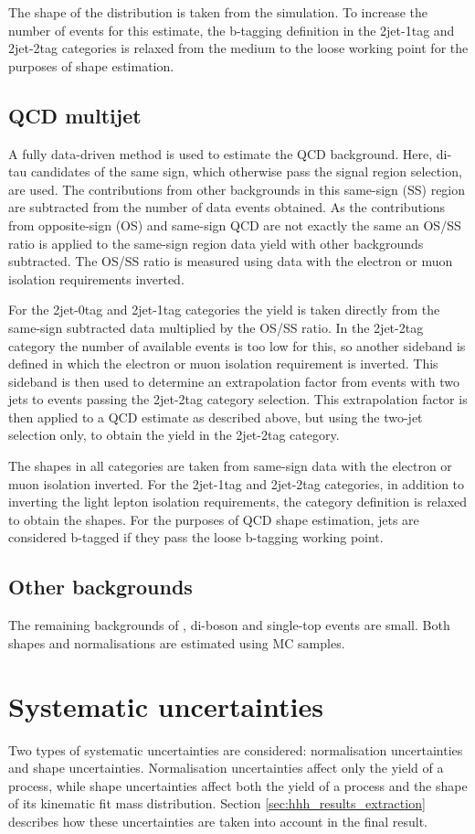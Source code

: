 The shape of the \Wjets distribution is taken from the simulation. To 
increase the number of events for this estimate, the b-tagging definition
in the 2jet-1tag and 2jet-2tag categories is relaxed from the medium to the loose 
working point for the purposes of shape estimation.
\subsection{QCD multijet}
\label{sec:hhh_backgrounds_qcd}
A fully data-driven method is used to estimate the QCD background. Here, di-tau candidates
of the same sign, which otherwise pass the signal region selection, are used. 
The contributions from other backgrounds
in this same-sign (SS) region are subtracted from the number of data events obtained.
As the contributions from opposite-sign (OS) and same-sign QCD are
not exactly the same an OS/SS ratio is applied to the same-sign region data yield with other backgrounds subtracted.
The OS/SS ratio is measured using data with 
the electron or muon isolation requirements inverted. 

For the 2jet-0tag and 2jet-1tag categories the yield is taken directly from
the same-sign subtracted data multiplied by the OS/SS ratio. In the 2jet-2tag
category the number of available events is too low for this, so another sideband is defined
in which the electron or muon isolation requirement is inverted. This 
sideband is then used to determine an extrapolation factor from events
with two jets to events passing the 2jet-2tag category selection. This extrapolation
factor is then applied to a QCD estimate as described above, but using the two-jet 
selection only, to obtain the yield in the 2jet-2tag category.

The shapes in all categories are taken from same-sign data with the electron or muon
isolation inverted. For the 2jet-1tag and 2jet-2tag categories, in addition to 
inverting the light lepton isolation requirements, the category definition
is relaxed to obtain the shapes. For the purposes of QCD shape
estimation, jets are considered b-tagged if they pass the loose b-tagging
working point.
\subsection{Other backgrounds}
\label{sec:hhh_backgrounds_other}
The remaining backgrounds of \Zellell, di-boson and single-top
events are small. Both shapes and normalisations are
estimated using \ac{MC} samples.
 
\section{Systematic uncertainties}
\label{sec:hhh_uncs}
Two types of systematic uncertainties are considered: normalisation
uncertainties and shape uncertainties. Normalisation uncertainties affect only
the yield of a process, while shape uncertainties affect both the yield of a process and the 
shape of its kinematic fit mass distribution. 
Section \ref{sec:hhh_results_extraction}
describes how these uncertainties are taken into account in the final result.
